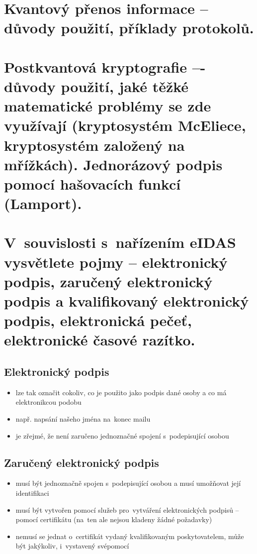 \clearpage
\section{Kvantový přenos informace -- důvody použití, příklady protokolů.}

\clearpage
\section{Postkvantová kryptografie –- důvody použití, jaké těžké matematické problémy se zde využívají (kryptosystém McEliece, kryptosystém založený na mřížkách). Jednorázový podpis pomocí hašovacích funkcí (Lamport).}

\clearpage
\section{V~souvislosti s~nařízením eIDAS vysvětlete pojmy -- elektronický podpis, zaručený elektronický podpis a kvalifikovaný elektronický podpis, elektronická pečeť, elektronické časové razítko.}
\subsection{Elektronický podpis}
\begin{itemize}
    \item lze tak označit cokoliv, co je použito jako podpis dané osoby a co má elektronikcou podobu
    \item např. napsání našeho jména na~konec mailu
    \item je zřejmé, že není zaručeno jednoznačné spojení s~podepisující osobou
\end{itemize}

\subsection{Zaručený elektronický podpis}
\begin{itemize}
    \item musí být jednoznačně spojen s~podepisující osobou a musí umožňovat její identifikaci
    \item musí být vytvořen pomocí služeb pro~vytváření elektronických podpisů -- pomocí certifikátu (na~ten ale nejsou kladeny žádné požadavky)
    \item nemusí se jednat o~certifikát vydaný kvalifikovaným poskytovatelem, může být jakýkoliv, i~vystavený svépomocí
\end{itemize}


